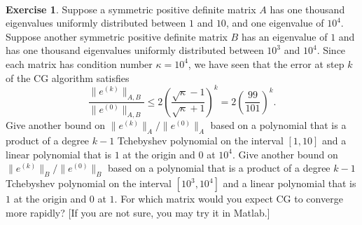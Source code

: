 \documentclass[12pt]{article}
\theoremstyle{definition}
\newtheorem{exer}{Exercise}
\theoremstyle{remark}
\begin{document}
\newpage
 \
 \newpage

\begin{exer}
    Suppose a symmetric positive definite matrix $A$ has one thousand eigenvalues
uniformly distributed between $1$ and $10$, and one eigenvalue of $10^4$.
Suppose another symmetric positive definite matrix $B$ has an eigenvalue
of $1$ and has one thousand eigenvalues uniformly distributed between $10^3$
and $10^4$.
Since each matrix has condition number $\kappa = 10^4$, we have seen
that the error at step $k$ of the CG algorithm satisfies
\[
\frac{\| e^{(k)} \|_{A,B}}{\| e^{(0)} \|_{A,B}} \leq 2 \left( \frac{
\sqrt{\kappa} - 1}{\sqrt{\kappa} +1} \right)^k = 2 \left( \frac{99}{101} 
\right)^k .
\]
Give another bound on $\| e^{(k)} \|_A / \| e^{(0)} \|_A$ based
on a polynomial that is a product of a degree $k-1$ Tchebyshev polynomial
on the interval $[1,10]$ and a linear polynomial that is $1$ at the
origin and $0$ at $10^4$.  Give another bound on $\| e^{(k)} \|_B /
\| e^{(0)} \|_B$ based on a polynomial that is a product of a degree $k-1$ 
Tchebyshev polynomial on the interval $[ 10^3 , 10^4]$ and a linear polynomial
that is $1$ at the origin and $0$ at $1$.  For which matrix would you
expect CG to converge more rapidly?  [If you are not sure, you may try
it in Matlab.]
\end{exer}
\end{document}
